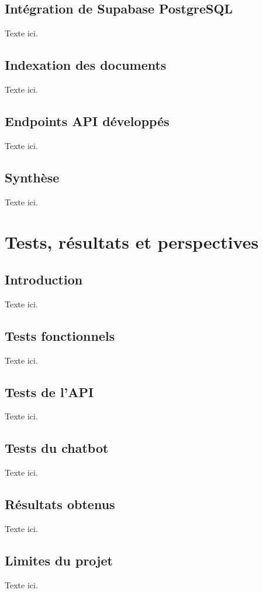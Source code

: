 \documentclass[12pt,a4paper]{report}
\begin{document}
\section{Intégration de Supabase PostgreSQL}
Texte ici.

\section{Indexation des documents}
Texte ici.

\section{Endpoints API développés}
Texte ici.

\section{Synthèse}
Texte ici.

\chapter{Tests, résultats et perspectives}

\section{Introduction}
Texte ici.

\section{Tests fonctionnels}
Texte ici.

\section{Tests de l'API}
Texte ici.

\section{Tests du chatbot}
Texte ici.

\section{Résultats obtenus}
Texte ici.

\section{Limites du projet}
Texte ici.
\end{document}
